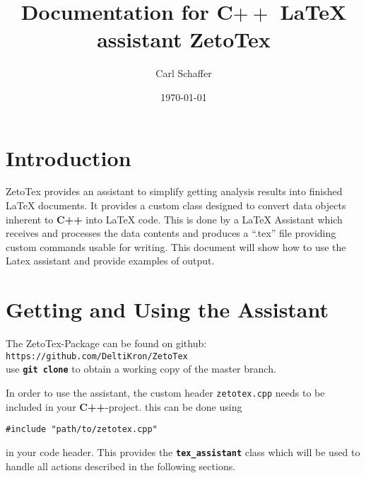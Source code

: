 \documentclass[10pt,a4paper]{article}
\title{Documentation for C${++}$ \LaTeX{} assistant ZetoTex}
\date{\today{}}
\author{Carl Schaffer}
\begin{document}
      \maketitle
      \newpage{}

      \setlength{\parindent}{0pt}

      \newcommand{\stdv}{\texttt{std::vector} } 
      \newcommand{\la}{LaTeX Assistant}
      \newcommand{\ta}{\texttt{\textbf{tex\_assistant}}}
      \newcommand{\filename}[1]{\texttt{#1}}
      \newcommand{\cpp}{\textbf{C++}}
      \newcommand{\ztt}{ZetoTex}

      \newcommand{\singleValCmd}{\cmdstyle{.ncmdValue()}}
      \newcommand{\arrayCmd}{\cmdstyle{.ncmdArray()}}
      \newcommand{\cmdstyle}[1]{\textbf{\texttt{#1}}}

      \newcommand{\headerfile}{\filename{zetotex.cpp}}
      \newcommand{\texfile}{\enquote{.tex} file}


\section{Introduction}
 \ztt{} provides an assistant to simplify
getting analysis results into finished \LaTeX{} documents. It
provides a custom class designed to convert data objects inherent to \cpp{} into
\LaTeX{} code. This is done by a \la{} which receives and processes the data
contents and produces a \enquote{.tex} file providing custom commands usable for
writing. This document will show how to use the Latex assistant and provide
examples of output.



\section{Getting and Using the Assistant}

The ZetoTex-Package can be found on github:\\

\texttt{https://github.com/DeltiKron/ZetoTex}
\\
use \cmdstyle{git clone} to obtain a working copy of the master branch.

In order to use the assistant, the custom header \headerfile{} needs to be
included in your \cpp{}-project. this can be done using
\begin{verbatim}
#include "path/to/zetotex.cpp"
\end{verbatim}
in your code header. This provides the \ta{} class which will be used to handle
all actions described in the following sections.
\end{document}
